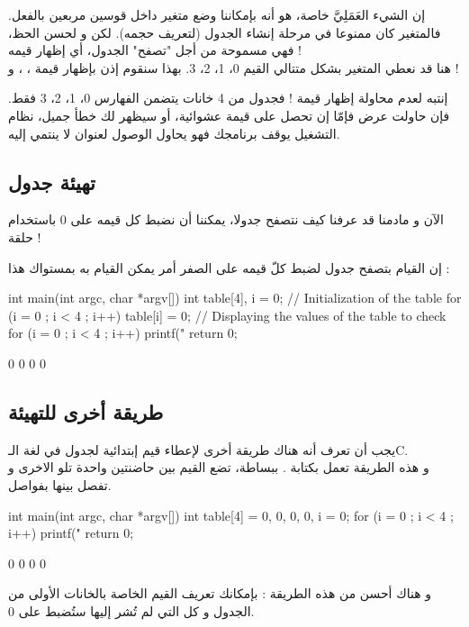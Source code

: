 إن الشيء العَمَلِيَّ خاصة، هو أنه بإمكاننا وضع متغير داخل قوسين مربعين بالفعل. فالمتغير كان ممنوعا في مرحلة إنشاء الجدول (لتعريف حجمه). لكن و لحسن الحظ، فهي مسموحة من أجل "تصفح" الجدول، أي إظهار قيمه !\\
هنا قد نعطي المتغير
بشكل متتالي القيم 0، 1، 2، 3. بهذا سنقوم إذن بإظهار قيمة
،
،
و
 !
\begin{critical}
  إنتبه لعدم محاولة إظهار قيمة
 !
فجدول من 4 خانات يتضمن الفهارس 0، 1، 2، 3 فقط. فإن حاولت عرض
فإمّا إن تحصل على قيمة عشوائية، أو سيظهر لك خطأ جميل، نظام التشغيل يوقف برنامجك فهو يحاول الوصول لعنوان لا ينتمي إليه.
\end{critical}

\subsection{تهيئة جدول}
الآن و مادمنا قد عرفنا كيف نتصفح جدولا، يمكننا أن نضبط كل قيمه على 0 باستخدام حلقة !

إن القيام بتصفح جدول لضبط كلّ قيمه على الصفر أمر يمكن القيام به بمستواك هذا :
\begin{Csource}
int main(int argc, char *argv[])
{
	int table[4], i = 0;
	// Initialization of the table
	for (i = 0 ; i < 4 ; i++)
	{
    		table[i] = 0;
	}
	// Displaying the values of the table to check
	for (i = 0 ; i < 4 ; i++)
	{
    		printf("%
	}
	return 0;
}
\end{Csource}
\begin{Console}
0
0
0
0
\end{Console}

\subsection{طريقة أخرى للتهيئة}
يجب أن تعرف أنه هناك طريقة أخرى لإعطاء قيم إبتدائية لجدول في لغة الـ\textenglish{C}.\\
و هذه الطريقة تعمل بكتابة
.
ببساطة، تضع القيم بين حاضنتين واحدة تلو الاخرى و تفصل بينها بفواصل.
\begin{Csource}
int main(int argc, char *argv[])
{
	int table[4] = {0, 0, 0, 0}, i = 0;
	for (i = 0 ; i < 4 ; i++)
	{
    	printf("%
	}
	return 0;
}
\end{Csource}
\begin{Console}
0
0
0
0
\end{Console}
و هناك أحسن من هذه الطريقة : بإمكانك تعريف القيم الخاصة بالخانات الأولى من الجدول و كل التي لم تُشر إليها ستُضبط على 0.

